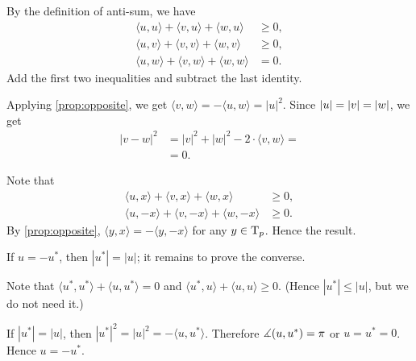 By the definition of anti-sum, we have
\begin{align*}
\langle u,u\rangle +\langle v,u\rangle +\langle w,u\rangle &\ge 0,
\\
\langle u,v\rangle +\langle v,v\rangle +\langle w,v\rangle &\ge 0,
\\
\langle u,w\rangle +\langle v,w\rangle +\langle w,w\rangle &= 0.
\end{align*}
Add the first two inequalities and subtract the last identity.

Applying \ref{prop:opposite}, we get $\langle v,w\rangle=-\langle u,w\rangle=|u|^2$.
Since $|u|\z=|v|\z=|w|$, we get
\begin{align*}
|v-w|^2&=|v|^2+|w|^2-2\cdot \langle v,w\rangle=
\\
&=0.
\end{align*}


Note that 
\begin{align*}
\langle u,x\rangle +\langle v,x\rangle +\langle w,x\rangle &\ge 0,
\\
\langle u,-x\rangle +\langle v,-x\rangle +\langle w,-x\rangle &\ge 0.
\end{align*}
By \ref{prop:opposite}, $\langle y,x\rangle=-\langle y ,-x\rangle$ for any $y\in \mathrm{T}_p$.
Hence the result.


If $u=-u^*$, then $|u^*|= |u|$; it remains to prove the converse.

Note that $\langle u^*,u^*\rangle +\langle u,u^*\rangle = 0$
and $\langle u^*,u\rangle +\langle u,u\rangle \ge 0$.
(Hence $|u^*|\le |u|$, but we do not need it.)

If $|u^*|= |u|$, then $|u^*|^2=|u|^2=-\langle u,u^*\rangle$.
Therefore $\measuredangle(u,u^*)=\pi$ or $u=u^*=0$.
Hence $u=-u^*$.
